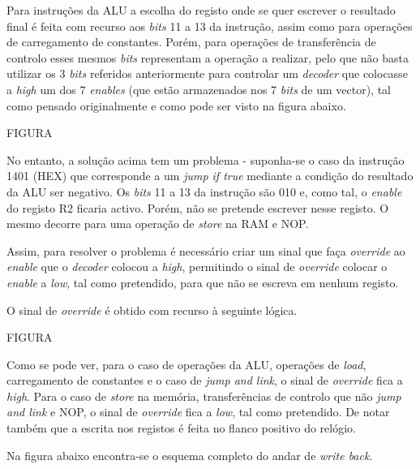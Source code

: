 \documentclass[11pt]{article}
\numberwithin{equation}{section}
\begin{document}
Para instruções da ALU a escolha do registo onde se quer escrever o resultado final é feita com recurso aos \textit{bits} 11 a 13 da instrução, assim como para operações de carregamento de constantes. Porém, para operações de transferência de controlo esses mesmos \textit{bits} representam a operação a realizar, pelo que não basta utilizar os 3 \textit{bits} referidos anteriormente para controlar um \textit{decoder} que colocasse a \textit{high} um dos 7 \textit{enables} (que estão armazenados nos 7 \textit{bits} de um vector), tal como pensado originalmente e como pode ser visto na figura abaixo.

FIGURA

No entanto, a solução acima tem um problema - suponha-se o caso da instrução 1401 (HEX) que corresponde a um \textit{jump if true} mediante a condição do resultado da ALU ser negativo. Os \textit{bits} 11 a 13 da instrução são 010 e, como tal, o \textit{enable} do registo R2 ficaria activo. Porém, não se pretende escrever nesse registo. O mesmo decorre para uma operação de \textit{store} na RAM e NOP. 

Assim, para resolver o problema é necessário criar um sinal que faça \textit{override} ao \textit{enable} que o \textit{decoder} colocou a \textit{high}, permitindo o sinal de \textit{override} colocar o \textit{enable} a \textit{low}, tal como pretendido, para que não se escreva em nenhum registo.

O sinal de \textit{override} é obtido com recurso à seguinte lógica.

FIGURA

Como se pode ver, para o caso de operações da ALU, operações de \textit{load}, carregamento de constantes e o caso de \textit{jump and link}, o sinal de \textit{override} fica a \textit{high}. Para o caso de \textit{store} na memória, transferências de controlo que não \textit{jump and link} e NOP, o sinal de \textit{override} fica a \textit{low}, tal como pretendido. De notar também que a escrita nos registos é feita no flanco positivo do relógio. 

Na figura abaixo encontra-se o esquema completo do andar de \textit{write back}.

\pagebreak

\listoftodos
\end{document}
